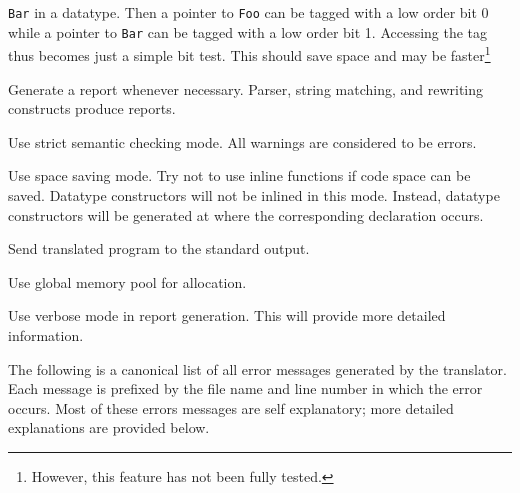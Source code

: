 \begin{description}
\verb|Bar|  in a datatype.  Then a pointer to \verb|Foo| can be tagged
with a low order bit 0 while a pointer to \verb|Bar| can be tagged with 
a low order bit 1.  Accessing the tag thus becomes just a simple bit
test.  This should save space and may be faster\footnote{However, this feature
has not been fully tested.}
\item[\OPTIONDEF{-r -report}]  
Generate a report whenever necessary.  Parser, string
matching, and rewriting constructs produce reports.
\item[\OPTIONDEF{-s -strict}]  Use strict semantic checking mode.  
All warnings are considered to be errors.
\item[\OPTIONDEF{-S -save\_space}]\label{option:save-space} 
Use space saving mode.  
Try not to use inline functions if code space can be saved.  
Datatype constructors will not be inlined
in this mode.  Instead, datatype constructors will be generated at
where the corresponding  declaration occurs.
\item[\OPTIONDEF{-t -stdout}]   Send translated program to the standard output.
\item[\OPTIONDEF{-use\_global\_pool}]  Use global memory pool for allocation.
\item[\OPTIONDEF{-v{\em num}}]  Use verbose mode in report generation.
This will provide more detailed information.
\end{description}


The following is a canonical list of all error messages generated by
the \Prop{} translator.  Each message is prefixed by the
file name and line number in which the error occurs.    Most of these
errors messages are self explanatory; more detailed explanations are provided
below.


